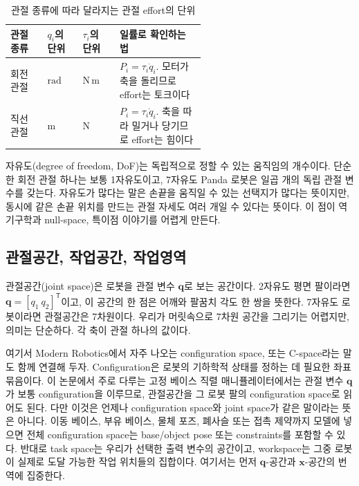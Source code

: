 \begin{table}[!htbp]
  \centering
  \caption{관절 종류에 따라 달라지는 관절 effort의 단위}
  \label{tab:joint-type-units-generalized-effort}
  \small
  \renewcommand{\arraystretch}{1.12}
  \begin{tabularx}{\linewidth}{@{}p{0.19\linewidth}p{0.18\linewidth}p{0.19\linewidth}X@{}}
    \toprule
    관절 종류 & \(q_i\)의 단위 & \(\tau_i\)의 단위 & 일률로 확인하는 법 \\
    \midrule
    회전 관절 & \(\mathrm{rad}\) & \(\mathrm{N\,m}\) & \(P_i=\tau_i\dot{q}_i\). 모터가 축을 돌리므로 effort는 토크이다 \\
    직선 관절 & \(\mathrm{m}\) & \(\mathrm{N}\) & \(P_i=\tau_i\dot{q}_i\). 축을 따라 밀거나 당기므로 effort는 힘이다 \\
    \bottomrule
  \end{tabularx}
\end{table}

자유도(degree of freedom, DoF)는 독립적으로 정할 수 있는 움직임의 개수이다.
단순한 회전 관절 하나는 보통 1자유도이고, 7자유도 Panda 로봇은 일곱 개의 독립 관절 변수를 갖는다.
자유도가 많다는 말은 손끝을 움직일 수 있는 선택지가 많다는 뜻이지만, 동시에 같은 손끝 위치를 만드는 관절 자세도 여러 개일 수 있다는 뜻이다.
이 점이 역기구학과 null-space, 특이점 이야기를 어렵게 만든다.

\subsection{관절공간, 작업공간, 작업영역}
\label{sec:robotics-joint-task-workspace}

관절공간(joint space)은 로봇을 관절 변수 \(\bm{q}\)로 보는 공간이다.
2자유도 평면 팔이라면 \(\bm{q}=[q_1\ q_2]^{\mathsf{T}}\)이고, 이 공간의 한 점은 어깨와 팔꿈치 각도 한 쌍을 뜻한다.
7자유도 로봇이라면 관절공간은 7차원이다.
우리가 머릿속으로 7차원 공간을 그리기는 어렵지만, 의미는 단순하다.
각 축이 관절 하나의 값이다.

여기서 Modern Robotics에서 자주 나오는 configuration space, 또는 C-space라는 말도 함께 연결해 두자.
Configuration은 로봇의 기하학적 상태를 정하는 데 필요한 좌표 묶음이다.
이 논문에서 주로 다루는 고정 베이스 직렬 매니퓰레이터에서는 관절 변수 \(\bm{q}\)가 보통 configuration을 이루므로, 관절공간을 그 로봇 팔의 configuration space로 읽어도 된다.
%
다만 이것은 언제나 configuration space와 joint space가 같은 말이라는 뜻은 아니다.
%
이동 베이스, 부유 베이스, 물체 포즈, 폐사슬 또는 접촉 제약까지 모델에 넣으면 전체 configuration space는 base/object pose 또는 constraints를 포함할 수 있다.
%
반대로 task space는 우리가 선택한 출력 변수의 공간이고, workspace는 그중 로봇이 실제로 도달 가능한 작업 위치들의 집합이다.
%
%
여기서는 먼저 \(\bm{q}\)-공간과 \(\bm{x}\)-공간의 번역에 집중한다.
%

